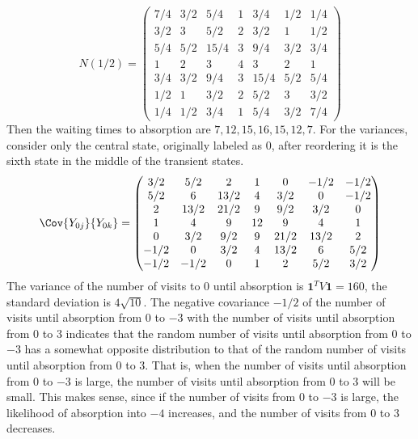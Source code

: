 \documentclass[12pt]{article}
\begin{document}
\begin{example}
    \[
        N(1/2) =
        \begin{pmatrix}
            7/4 & 3/2 & 5/4 & 1 & 3/4 & 1/2 & 1/4\\
            3/2 & 3 & 5/2 & 2 & 3/2 & 1 & 1/2\\
            5/4 & 5/2 & 15/4 & 3 & 9/4 & 3/2 & 3/4\\
            1 & 2 & 3 & 4 & 3 & 2 & 1\\
            3/4 & 3/2 & 9/4 & 3 & 15/4 & 5/2 & 5/4\\
            1/2 & 1 & 3/2 & 2 & 5/2 & 3 & 3/2 \\
            1/4 & 1/2 & 3/4 & 1 & 5/4 & 3/2 & 7/4
        \end{pmatrix}
    \] Then the waiting times to absorption are \( 7, 12, 15, 16, 15,
    12, 7 \).  For the variances, consider only the central state,
    originally labeled as \( 0 \), after reordering it is the sixth
    state in the middle of the transient states.
    \[
        \Cov{Y_{0j}}{ Y_{0k}} =
        \begin{pmatrix}
            3/2 & 5/2 & 2 & 1 & 0 & -1/2 & -1/2 \\
            5/2 & 6 & 13/2 & 4 & 3/2 & 0 & -1/2\\
            2 & 13/2 & 21/2 & 9 & 9/2 & 3/2 & 0\\
            1 & 4 & 9 & 12 & 9 & 4 & 1\\
            0 & 3/2 & 9/2 & 9 & 21/2 & 13/2 & 2\\
            -1/2 & 0 & 3/2 & 4 & 13/2 & 6 & 5/2\\
            -1/2 & -1/2 & 0 & 1 & 2 & 5/2 & 3/2
        \end{pmatrix}
    \] The variance of the number of visits to \( 0 \) until
    absorption is \( \mathbf{1}^{T} V \mathbf{1} = 160 \), the
    standard deviation is \( 4 \sqrt{10} \).  The negative covariance
    \( -1/2 \)
    of the number of visits until absorption from \( 0 \) to \( -3 \)
    with the  number of visits until absorption from \( 0 \) to \( 3 \) 
    indicates that the random number of visits until absorption
    from \( 0 \) to \( -3 \) has a somewhat opposite distribution to
    that of the random number of visits until absorption
    from \( 0 \) to \( 3 \).  That is, when the number of visits until absorption
    from \( 0 \) to \( -3 \) is large, the number of visits until absorption
    from \( 0 \) to \( 3 \) will be small.  This makes sense, since if
    the number of visits from \( 0 \) to \( -3 \) is large, the
    likelihood of absorption into \( -4 \)  increases, and the
    number of visits from \( 0 \) to \( 3 \) decreases.


\end{example}
\end{document}
